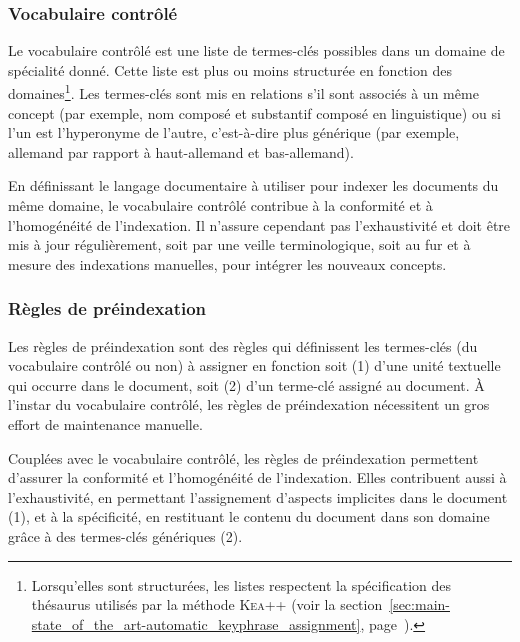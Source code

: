     \subsubsection{Vocabulaire contrôlé}
    \label{subsubsec:main-domain_specific_keyphrase_annotation-manual_keyphrase_annotation-resources-controlled_vocabulary}
      Le vocabulaire contrôlé est une liste de termes-clés possibles dans un
      domaine de spécialité donné. Cette liste est plus ou moins structurée en
      fonction des domaines\footnote{Lorsqu'elles sont structurées, les listes
      respectent la spécification des thésaurus utilisés par la méthode
      \textsc{Kea++} (voir la
      section~\ref{sec:main-state_of_the_art-automatic_keyphrase_assignment},
      page~\pageref{sec:main-state_of_the_art-automatic_keyphrase_assignment}).}.
      Les termes-clés sont mis en relations s'il sont associés à un même
      concept (par exemple, \og{}nom composé\fg{} et \og{}substantif
      composé\fg{} en linguistique) ou si l'un est l'hyperonyme de l'autre,
      c'est-à-dire plus  générique (par exemple, \og{}allemand\fg{} par
      rapport à \og{}haut-allemand\fg{} et \og{}bas-allemand\fg{}).
      
      En définissant le langage documentaire à utiliser pour indexer les
      documents du même domaine, le vocabulaire contrôlé contribue à la
      conformité et à l'homogénéité de l'indexation. Il n'assure cependant pas
      l'exhaustivité et doit être mis à jour régulièrement, soit par une
      veille terminologique, soit au fur et à mesure des indexations
      manuelles, pour intégrer les nouveaux concepts.

    \subsubsection{Règles de préindexation}
    \label{subsubsec:main-domain_specific_keyphrase_annotation-manual_keyphrase_annotation-resources-preindexing_rules}
      Les règles de préindexation sont des règles qui définissent les
      termes-clés (du vocabulaire contrôlé ou non) à assigner en fonction soit
      (1) d'une unité textuelle qui occurre dans le document, soit (2) d'un
      terme-clé assigné au document. À l'instar du vocabulaire contrôlé, les
      règles de préindexation nécessitent un gros effort de maintenance manuelle.
      
      Couplées avec le vocabulaire contrôlé, les règles de préindexation
      permettent d'assurer la conformité et l'homogénéité de l'indexation.
      Elles contribuent aussi à l'exhaustivité, en permettant l'assignement
      d'aspects implicites dans le document (1), et à la spécificité, en
      restituant le contenu du document dans son domaine grâce à des
      termes-clés génériques (2).

